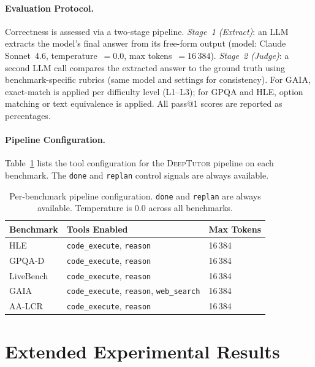 \paragraph{Evaluation Protocol.}
Correctness is assessed via a two-stage pipeline.
\emph{Stage~1 (Extract)}: an LLM extracts the model's final answer from its free-form output (model: Claude Sonnet~4.6, temperature~$= 0.0$, max tokens~$= 16\,384$).
\emph{Stage~2 (Judge)}: a second LLM call compares the extracted answer to the ground truth using benchmark-specific rubrics (same model and settings for consistency).
For GAIA, exact-match is applied per difficulty level (L1--L3); for GPQA and HLE, option matching or text equivalence is applied.
All pass@1 scores are reported as percentages.

\paragraph{Pipeline Configuration.}
Table~\ref{tab:pipeline_config} lists the tool configuration for the \textsc{DeepTutor} pipeline on each benchmark.
The \texttt{done} and \texttt{replan} control signals are always available.

\begin{table}[ht!]
\centering
\small
\begin{tabular}{@{}lll@{}}
\toprule
\textbf{Benchmark} & \textbf{Tools Enabled} & \textbf{Max Tokens} \\
\midrule
HLE        & \texttt{code\_execute}, \texttt{reason}                & 16\,384 \\
GPQA-D     & \texttt{code\_execute}, \texttt{reason}                & 16\,384 \\
LiveBench  & \texttt{code\_execute}, \texttt{reason}                & 16\,384 \\
GAIA       & \texttt{code\_execute}, \texttt{reason}, \texttt{web\_search} & 16\,384 \\
AA-LCR     & \texttt{code\_execute}, \texttt{reason}                & 16\,384 \\
\bottomrule
\end{tabular}
\caption{Per-benchmark pipeline configuration. \texttt{done} and \texttt{replan} are always available. Temperature is $0.0$ across all benchmarks.}
\label{tab:pipeline_config}
\end{table}

\section{Extended Experimental Results}
\label{app:results}


